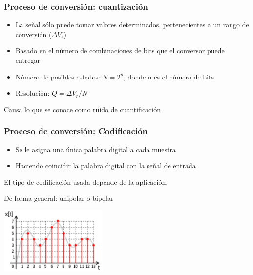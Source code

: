 \documentclass{beamer}
\begin{document}
\begin{frame}
	\frametitle{Proceso de conversión: cuantización}
		\begin{block}{} 
    	\begin{itemize}
      	\item La señal sólo puede tomar valores determinados, pertenecientes a
un rango de conversión ($\Delta V_r$) 
      	\item Basado en el número de combinaciones de bits que el conversor
puede entregar
      	\item Número de posibles estados: \alert{$N = 2^n$}, donde \alert{n} es el
número de bits
      	\item Resolución: $Q = \Delta V_r / N$
    	\end{itemize}
		\end{block}
{
		\begin{block}{}
Causa lo que se conoce como {\color[rgb]{0.43, 0.21, 0.1} ruido de cuantificación} 
		\end{block}
}
\begin{center}
\end{center}
\end{frame} 

\begin{frame}
\frametitle{Proceso de conversión: Codificación}
\begin{block}{}
\begin{itemize}
\item Se le asigna una única palabra digital a cada muestra 
\item Haciendo coincidir la palabra digital con la señal de entrada 
\end{itemize}
\end{block}
{
\begin{block}{}
El tipo de codificación usada depende de la aplicación.

De forma general: {\color[rgb]{0.5,.4,0} unipolar} o {\color[rgb]{0.5,.4,0}
bipolar}
\end{block}
}
\begin{center}
\includegraphics[width=0.4\textwidth]{d3/digital_signal}
\end{center}
\end{frame} 
\end{document}
